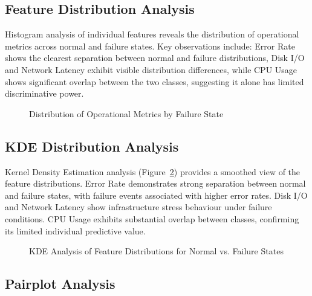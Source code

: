 \documentclass[12pt,letterpaper]{report}
\begin{document}
\subsection{Feature Distribution Analysis}

Histogram analysis of individual features reveals the distribution of operational metrics across normal and failure states. Key observations include: Error Rate shows the clearest separation between normal and failure distributions, Disk I/O and Network Latency exhibit visible distribution differences, while CPU Usage shows significant overlap between the two classes, suggesting it alone has limited discriminative power.

\begin{figure}[H]
\centering
{}
\caption{Distribution of Operational Metrics by Failure State}
\label{fig:histograms}
\end{figure}

\subsection{KDE Distribution Analysis}

Kernel Density Estimation analysis (Figure~\ref{fig:kde}) provides a smoothed view of the feature distributions. Error Rate demonstrates strong separation between normal and failure states, with failure events associated with higher error rates. Disk I/O and Network Latency show infrastructure stress behaviour under failure conditions. CPU Usage exhibits substantial overlap between classes, confirming its limited individual predictive value.

\begin{figure}[H]
\centering
{}
\caption{KDE Analysis of Feature Distributions for Normal vs. Failure States}
\label{fig:kde}
\end{figure}

\subsection{Pairplot Analysis}
\end{document}
